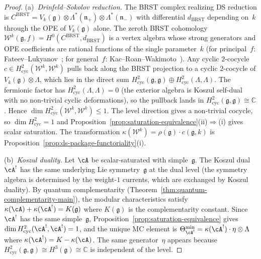 \begin{proof}
(a)~\emph{Drinfeld--Sokolov reduction.}
The BRST complex realizing DS reduction is
$C^{\mathrm{BRST}} = V_k(\mathfrak{g})
\otimes \Lambda^*(\mathfrak{n}_+)
\otimes \Lambda^*(\mathfrak{n}_-)$
with differential $d_{\mathrm{BRST}}$ depending on~$k$
through the OPE of $V_k(\mathfrak{g})$ alone.
The zeroth BRST cohomology
$\mathcal{W}^k(\mathfrak{g},f) = H^0(C^{\mathrm{BRST}},
d_{\mathrm{BRST}})$
is a vertex algebra whose strong generators and OPE
coefficients are rational functions of the single parameter~$k$
(for principal~$f$: Fateev--Lukyanov~\cite{FL88};
for general~$f$: Kac--Roan--Wakimoto~\cite{KRW}).
Any cyclic $2$-cocycle
$c \in H^2_{\mathrm{cyc}}(\mathcal{W}^k, \mathcal{W}^k)$
pulls back along the BRST projection to a cyclic $2$-cocycle
of $V_k(\mathfrak{g}) \otimes \Lambda$, which lies in the
direct sum $H^2_{\mathrm{cyc}}(\mathfrak{g},\mathfrak{g})
\oplus H^2_{\mathrm{cyc}}(\Lambda,\Lambda)$.
The fermionic factor has $H^2_{\mathrm{cyc}}(\Lambda,\Lambda) = 0$
(the exterior algebra is Koszul self-dual with no non-trivial
cyclic deformations), so the pullback lands in
$H^2_{\mathrm{cyc}}(\mathfrak{g},\mathfrak{g}) \cong
\mathbb{C}$.  Hence
$\dim H^2_{\mathrm{cyc}}(\mathcal{W}^k, \mathcal{W}^k) \leq 1$.
The level direction gives a non-trivial cocycle, so
$\dim H^2_{\mathrm{cyc}} = 1$ and
Proposition~\ref{prop:saturation-equivalence}(ii)$\Rightarrow$(i)
gives scalar saturation.
The transformation
$\kappa(\mathcal{W}^k) = \rho(\mathfrak{g}) \cdot
c(\mathfrak{g},k)$
is Proposition~\ref{prop:ds-package-functoriality}(i).

\smallskip\noindent
(b)~\emph{Koszul duality.}
Let $\cA$ be scalar-saturated with simple~$\mathfrak{g}$.
The Koszul dual $\cA^!$ has the same underlying Lie
symmetry~$\mathfrak{g}$ at the dual level
(the symmetry algebra is determined by the weight-$1$
currents, which are exchanged by Koszul duality).
By quantum complementarity
(Theorem~\ref{thm:quantum-complementarity-main}),
the modular characteristics satisfy
$\kappa(\cA) + \kappa(\cA^!) = K(\mathfrak{g})$
where $K(\mathfrak{g})$ is the complementarity constant.
Since $\cA^!$ has the same simple~$\mathfrak{g}$,
Proposition~\ref{prop:saturation-equivalence} gives
$\dim H^2_{\mathrm{cyc}}(\cA^!,\cA^!) = 1$,
and the unique MC element is
$\Theta_{\cA^!}^{\min} = \kappa(\cA^!) \cdot
\eta \otimes \Lambda$ where $\kappa(\cA^!) = K - \kappa(\cA)$.
The same generator~$\eta$ appears because
$H^2_{\mathrm{cyc}}(\mathfrak{g},\mathfrak{g}) \cong
H^3(\mathfrak{g}) \cong \mathbb{C}$ is independent of
the level.


\end{proof}
